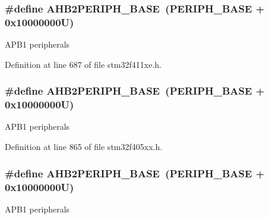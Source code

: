 \subsubsection[{\texorpdfstring{A\+H\+B2\+P\+E\+R\+I\+P\+H\+\_\+\+B\+A\+SE}{AHB2PERIPH_BASE}}]{\setlength{\rightskip}{0pt plus 5cm}\#define A\+H\+B2\+P\+E\+R\+I\+P\+H\+\_\+\+B\+A\+SE~({\bf P\+E\+R\+I\+P\+H\+\_\+\+B\+A\+SE} + 0x10000000\+U)}\hypertarget{group___peripheral__registers__structures_gaeedaa71d22a1948492365e2cd26cfd46}{}\label{group___peripheral__registers__structures_gaeedaa71d22a1948492365e2cd26cfd46}
A\+P\+B1 peripherals 

Definition at line 687 of file stm32f411xe.\+h.

\subsubsection[{\texorpdfstring{A\+H\+B2\+P\+E\+R\+I\+P\+H\+\_\+\+B\+A\+SE}{AHB2PERIPH_BASE}}]{\setlength{\rightskip}{0pt plus 5cm}\#define A\+H\+B2\+P\+E\+R\+I\+P\+H\+\_\+\+B\+A\+SE~({\bf P\+E\+R\+I\+P\+H\+\_\+\+B\+A\+SE} + 0x10000000\+U)}\hypertarget{group___peripheral__registers__structures_gaeedaa71d22a1948492365e2cd26cfd46}{}\label{group___peripheral__registers__structures_gaeedaa71d22a1948492365e2cd26cfd46}
A\+P\+B1 peripherals 

Definition at line 865 of file stm32f405xx.\+h.

\subsubsection[{\texorpdfstring{A\+H\+B2\+P\+E\+R\+I\+P\+H\+\_\+\+B\+A\+SE}{AHB2PERIPH_BASE}}]{\setlength{\rightskip}{0pt plus 5cm}\#define A\+H\+B2\+P\+E\+R\+I\+P\+H\+\_\+\+B\+A\+SE~({\bf P\+E\+R\+I\+P\+H\+\_\+\+B\+A\+SE} + 0x10000000\+U)}\hypertarget{group___peripheral__registers__structures_gaeedaa71d22a1948492365e2cd26cfd46}{}\label{group___peripheral__registers__structures_gaeedaa71d22a1948492365e2cd26cfd46}
A\+P\+B1 peripherals 

